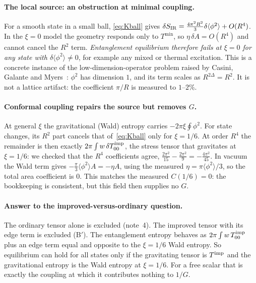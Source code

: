 \documentclass[11pt]{article}
\begin{document}
\paragraph{The local source: an obstruction at minimal coupling.} For a smooth state in a small ball, \eqref{eq:Kball} gives $\delta S_{\rm IR}=\tfrac{4\pi^2R^2}{3}\delta\langle\phi^2\rangle+O(R^4)$. In the $\xi=0$ model the geometry responds only to $T^{\min}$, so $\eta\,\delta A=O(R^4)$ and cannot cancel the $R^2$ term. \emph{Entanglement equilibrium therefore fails at $\xi=0$ for any state with $\delta\langle\phi^2\rangle\neq0$}, for example any mixed or thermal excitation. This is a concrete instance of the low-dimension-operator problem raised by Casini, Galante and Myers~\cite{CGM2016}: $\phi^2$ has dimension $1$, and its term scales as $R^{2\Delta}=R^2$. It is not a lattice artifact: the coefficient $\pi/R$ is measured to $1$--$2\%$.

\paragraph{Conformal coupling repairs the source but removes $G$.} At general $\xi$ the gravitational (Wald) entropy carries $-2\pi\xi\oint\phi^2$. For state changes, its $R^2$ part cancels that of~\eqref{eq:Kball} only for $\xi=1/6$. At order $R^4$ the remainder is then exactly $2\pi\int w\,\delta T^{\rm imp}_{00}$, the stress tensor that gravitates at $\xi=1/6$: we checked that the $R^4$ coefficients agree, $\tfrac{2\pi^2}{15}-\tfrac{2\pi^2}{9}=-\tfrac{4\pi^2}{45}$. In vacuum the Wald term gives $-\tfrac{\pi}{3}\langle\phi^2\rangle A=-\eta A$, using the measured $\eta=\pi\langle\phi^2\rangle/3$, so the total area coefficient is $0$. This matches the measured $C(1/6)=0$: the bookkeeping is consistent, but this field then supplies no $G$.

\paragraph{Answer to the improved-versus-ordinary question.} The ordinary tensor alone is excluded (note~4). The improved tensor with its edge term is excluded (B$'$). The entanglement entropy behaves as $2\pi\int w\,T^{\rm imp}_{00}$ plus an edge term equal and opposite to the $\xi=1/6$ Wald entropy. So equilibrium can hold for all states only if the gravitating tensor is $T^{\rm imp}$ and the gravitational entropy is the Wald entropy at $\xi=1/6$. For a free scalar that is exactly the coupling at which it contributes nothing to $1/G$.
\end{document}
